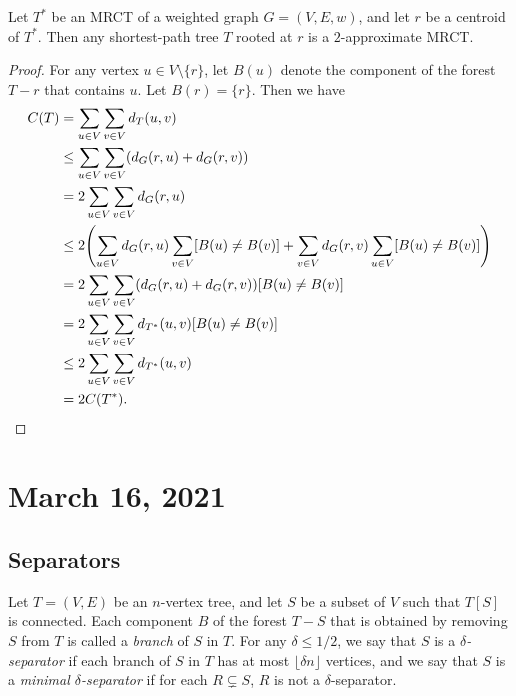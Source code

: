 \documentclass[11pt]{article}
\begin{document}
\begin{theorem}
  Let $T^*$ be an MRCT of a weighted graph $G = (V, E, w)$, and let $r$ be a centroid of $T^*$.
  Then any shortest-path tree $T$ rooted at $r$ is a $2$-approximate MRCT.
\end{theorem}
\begin{proof}
  For any vertex $u \in V \setminus \{r\}$, let $B(u)$ denote the component of the forest $T - r$ that contains $u$.
  Let $B(r) = \{r\}$.
  Then we have
  \begin{align*}
    C(T)
    &= \sum_{u \in V} \sum_{v \in V} d_T(u, v) \\
    &\leq \sum_{u \in V} \sum_{v \in V} (d_G(r, u) + d_G(r, v)) \\
    &= 2 \sum_{u \in V} \sum_{v \in V} d_G(r, u) \\
    &\leq 2 \Biggl( \sum_{u \in V} d_G(r, u) \sum_{v \in V} [B(u) \neq B(v)] + \sum_{v \in V} d_G(r, v) \sum_{u \in V} [B(u) \neq B(v)] \Biggr) \\
    &= 2 \sum_{u \in V} \sum_{v \in V} (d_G(r, u) + d_G(r, v)) [B(u) \neq B(v)] \\
    &= 2 \sum_{u \in V} \sum_{v \in V} d_{T^*}(u, v) [B(u) \neq B(v)] \\
    &\leq 2 \sum_{u \in V} \sum_{v \in V} d_{T^*}(u, v) \\
    &= 2C(T^*).
    \qedhere
  \end{align*}
\end{proof}

\section{March 16, 2021}
\subsection{Separators}
Let $T = (V, E)$ be an $n$-vertex tree, and let $S$ be a subset of $V$ such that $T[S]$ is connected.
Each component $B$ of the forest $T - S$ that is obtained by removing $S$ from $T$ is called a \emph{branch} of $S$ in $T$.
For any $\delta \leq 1/2$, we say that $S$ is a \emph{$\delta$-separator} if each branch of $S$ in $T$ has at most $\lfloor \delta n \rfloor$ vertices, and we say that $S$ is a \emph{minimal $\delta$-separator} if for each $R \subsetneq S$, $R$ is not a $\delta$-separator.
\end{document}
